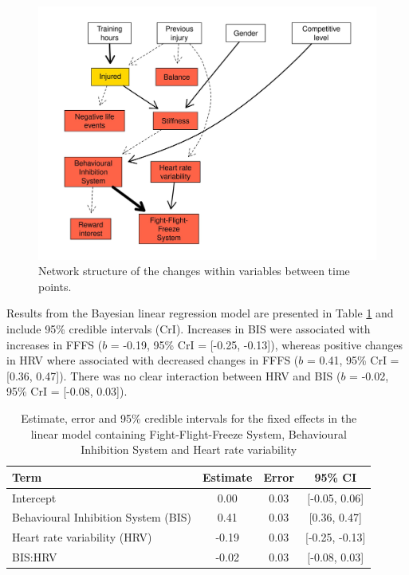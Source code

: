 \documentclass[
  english,
  man]{apa6}
\begin{document}
\begin{figure}

{\centering \includegraphics[width=1\linewidth]{figures_doc/Fig4} 

}

\caption{Network structure of the changes within variables between time points.}\label{fig:fig4}
\end{figure}

Results from the Bayesian linear regression model are presented in Table \ref{tab:table8} and include 95\% credible intervals (CrI).
Increases in BIS were associated with increases in FFFS (\(b\) = -0.19, 95\% CrI = {[}-0.25, -0.13{]}), whereas positive changes in HRV where associated with decreased changes in FFFS (\(b\) = 0.41, 95\% CrI = {[}0.36, 0.47{]}).
There was no clear interaction between HRV and BIS (\(b\) = -0.02, 95\% CrI = {[}-0.08, 0.03{]}).

\begin{table}[H]

\caption{\label{tab:table8}Estimate, error and 95\% credible intervals for the fixed effects in the linear model containing Fight-Flight-Freeze System, Behavioural Inhibition System and Heart rate variability}
\centering
\begin{tabular}[t]{l|c|c|c}
\hline
\textbf{Term} & \textbf{Estimate} & \textbf{Error} & \textbf{95\% CI}\\
\hline
Intercept & 0.00 & 0.03 & [-0.05, 0.06]\\
\hline
Behavioural Inhibition System (BIS) & 0.41 & 0.03 & [0.36, 0.47]\\
\hline
Heart rate variability (HRV) & -0.19 & 0.03 & [-0.25, -0.13]\\
\hline
BIS:HRV & -0.02 & 0.03 & [-0.08, 0.03]\\
\hline
\end{tabular}
\end{table}
\end{document}
